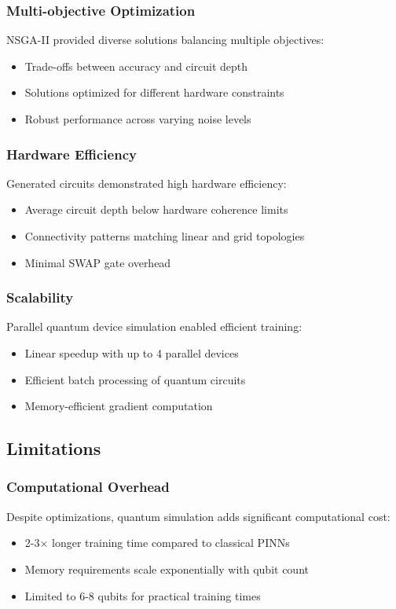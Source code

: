 \documentclass[11pt,a4paper,uplatex,dvipdfmx]{jsarticle}
\begin{document}
\subsubsection{Multi-objective Optimization}
NSGA-II provided diverse solutions balancing multiple objectives:
\begin{itemize}
    \item Trade-offs between accuracy and circuit depth
    \item Solutions optimized for different hardware constraints
    \item Robust performance across varying noise levels
\end{itemize}

\subsubsection{Hardware Efficiency}
Generated circuits demonstrated high hardware efficiency:
\begin{itemize}
    \item Average circuit depth below hardware coherence limits
    \item Connectivity patterns matching linear and grid topologies
    \item Minimal SWAP gate overhead
\end{itemize}

\subsubsection{Scalability}
Parallel quantum device simulation enabled efficient training:
\begin{itemize}
    \item Linear speedup with up to 4 parallel devices
    \item Efficient batch processing of quantum circuits
    \item Memory-efficient gradient computation
\end{itemize}

\subsection{Limitations}

\subsubsection{Computational Overhead}
Despite optimizations, quantum simulation adds significant computational cost:
\begin{itemize}
    \item 2-3× longer training time compared to classical PINNs
    \item Memory requirements scale exponentially with qubit count
    \item Limited to 6-8 qubits for practical training times
\end{itemize}
\end{document}
